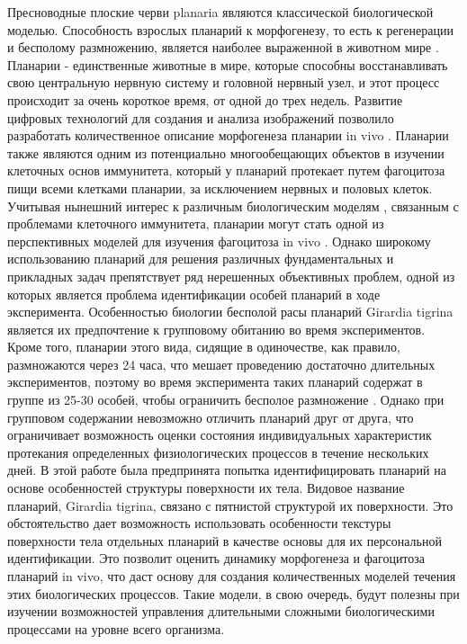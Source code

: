 \documentclass{article}
\begin{document}
Пресноводные плоские черви planaria являются классической биологической моделью. Способность взрослых планарий к морфогенезу, то есть к регенерации и бесполому
размножению, является наиболее выраженной в
животном мире \cite{int1} \cite{int2}. 
Планарии - единственные животные в мире, которые способны восстанавливать свою центральную нервную систему и головной нервный узел, и этот процесс происходит за очень короткое время, от одной до трех недель. 
Развитие цифровых технологий для создания и
анализа изображений позволило разработать
количественное описание морфогенеза планарии in vivo \cite{int3} \cite{int4}.
Планарии также являются одним из потенциально многообещающих
объектов в изучении клеточных основ иммунитета,
который у планарий протекает путем фагоцитоза пищи
всеми клетками планарии, за исключением нервных и половых клеток. 
Учитывая нынешний интерес к различным биологическим моделям
, связанным с проблемами клеточного иммунитета, планарии могут стать одной из перспективных моделей для изучения фагоцитоза in vivo \cite{int5} \cite{int6} \cite{int7}.
Однако широкому использованию планарий для
решения различных фундаментальных и прикладных
задач препятствует ряд нерешенных объективных проблем,
одной из которых является проблема идентификации
особей планарий в ходе эксперимента.
Особенностью биологии бесполой расы планарий
Girardia tigrina является их предпочтение к групповому обитанию
во время экспериментов. 
Кроме того,
планарии этого вида, сидящие в одиночестве, как правило, размножаются через 24 часа, что мешает проведению достаточно длительных
экспериментов, поэтому во время эксперимента таких
планарий содержат в группе из 25-30 особей, чтобы
ограничить бесполое размножение \cite{int8} \cite{int5}.
Однако при групповом содержании
невозможно отличить планарий друг от друга, что ограничивает возможность оценки состояния индивидуальных характеристик протекания
определенных физиологических процессов в течение нескольких дней.
В этой работе была предпринята попытка идентифицировать планарий на
основе особенностей структуры поверхности их тела. 
Видовое название планарий, Girardia
tigrina, связано с пятнистой структурой их поверхности. Это обстоятельство дает возможность использовать особенности текстуры поверхности тела
отдельных планарий в качестве основы для их
персональной идентификации.
Это позволит оценить динамику морфогенеза и
фагоцитоза планарий in vivo, что даст основу для создания количественных моделей течения этих биологических процессов.
Такие модели, в свою очередь,
будут полезны при изучении возможностей управления
длительными сложными биологическими процессами на уровне
всего организма.
\end{document}
